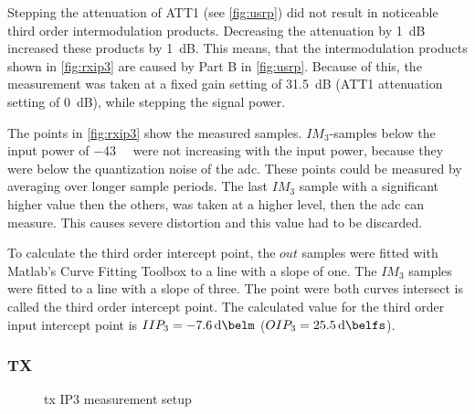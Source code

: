 \documentclass[12pt,a4paper,parskip=full,abstracton]{scrartcl}
\begin{document}
Stepping the attenuation of ATT1 (see \cref{fig:usrp}) did not result in noticeable
third order intermodulation products. Decreasing the attenuation by \SI{1}{\deci\bel} increased
these products by \SI{1}{\deci\bel}. This means, that the intermodulation products shown
in \cref{fig:rxip3} are caused by Part B in \cref{fig:usrp}. Because of this, the
measurement was taken at a fixed gain setting of \SI{31.5}{\deci\bel} (ATT1 attenuation
setting of \SI{0}{\deci\bel}), while stepping the signal power.

The points in \cref{fig:rxip3} show the measured samples. $IM_3$-samples
below the input power of \SI{-43}{\deci\belm} were not increasing with the input
power, because they were below the quantization noise of the \gls{adc}. These points
could be measured by averaging over longer sample periods. The last $IM_3$ sample
with a significant higher value then the others, was taken at a higher level, then
the \gls{adc} can measure. This causes severe distortion and this value had to be
discarded.

To calculate the third order intercept point, the $out$ samples were fitted with Matlab's
Curve Fitting Toolbox to a line with a slope of one. The $IM_3$ samples were fitted to
a line with a slope of three. The point were both curves intersect is called the third order intercept point.
The calculated value for the third order input intercept point is $IIP_3 = \SI{-7.6}{\deci\belm}$
($OIP_3 = \SI{25.5}{\deci\belfs}$).

\subsubsection{TX}
\label{sec:iptx}
\begin{figure}[htb]
    \centering
    \caption{\gls{tx} IP3 measurement setup}
    \label{fig:txipsetup}
\end{figure}
\end{document}
